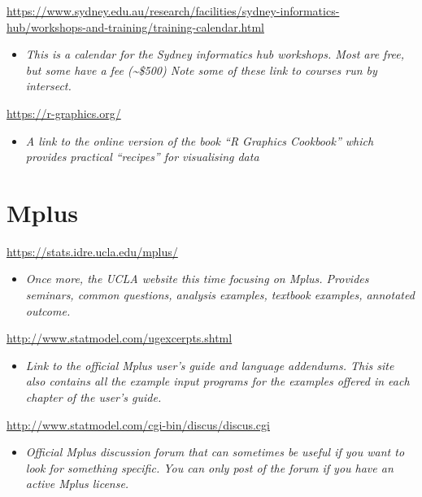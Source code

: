 \documentclass[
]{book}
\providecommand{\tightlist}{%
  \setlength{\itemsep}{0pt}\setlength{\parskip}{0pt}}
\begin{document}
\url{https://www.sydney.edu.au/research/facilities/sydney-informatics-hub/workshops-and-training/training-calendar.html}

\begin{itemize}
\tightlist
\item
  \emph{This is a calendar for the Sydney informatics hub workshops. Most are free, but some have a fee (\textasciitilde\$500) Note some of these link to courses run by intersect.}
\end{itemize}

\url{https://r-graphics.org/}

\begin{itemize}
\tightlist
\item
  \emph{A link to the online version of the book ``R Graphics Cookbook'' which provides practical ``recipes'' for visualising data}
\end{itemize}

\section{Mplus}\label{mplus}

\url{https://stats.idre.ucla.edu/mplus/}

\begin{itemize}
\tightlist
\item
  \emph{Once more, the UCLA website this time focusing on Mplus. Provides seminars, common questions, analysis examples, textbook examples, annotated outcome.}
\end{itemize}

\url{http://www.statmodel.com/ugexcerpts.shtml}

\begin{itemize}
\tightlist
\item
  \emph{Link to the official Mplus user's guide and language addendums. This site also contains all the example input programs for the examples offered in each chapter of the user's guide.}
\end{itemize}

\url{http://www.statmodel.com/cgi-bin/discus/discus.cgi}

\begin{itemize}
\tightlist
\item
  \emph{Official Mplus discussion forum that can sometimes be useful if you want to look for something specific. You can only post of the forum if you have an active Mplus license.}
\end{itemize}
\end{document}
